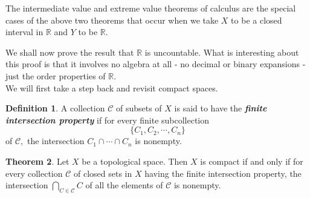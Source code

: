 \documentclass{article}
\theoremstyle{definition}
\newtheorem{theorem}{Theorem}[section]
\newtheorem{defn}[theorem]{Definition}
\begin{document}
The intermediate value and extreme value theorems of calculus are the special cases of the above two theorems that occur when we take $X$ to be a closed interval in $\mathbb{R}$ and $Y$ to be $\mathbb{R}.$

\hrulefill

We shall now prove the result that $\mathbb{R}$ is uncountable. What is interesting about this proof is that it involves no algebra at all - no decimal or binary expansions - just the order properties of $\mathbb{R}.$\\
We will first take a step back and revisit compact spaces.\\
\begin{defn}
  A collection $\mathcal{C}$ of subsets of $X$ is said to have the \textbf{\emph{finite intersection property}} if for every finite subcollection
  \[\{C_1, C_2, \cdots, C_n\}\]
  of $\mathcal{C},$ the intersection $C_1\cap \cdots\cap C_n$ is nonempty.
\end{defn}
\begin{theorem}\label{thm:finite intersection sets}
  Let $X$ be a topological space. Then $X$ is compact if and only if for every collection $\mathcal{C}$ of closed sets in $X$ having the finite intersection property, the intersection $\displaystyle\bigcap_{C\in\mathcal{C}}C$ of all the elements of $\mathcal{C}$ is nonempty.
\end{theorem}
\end{document}
